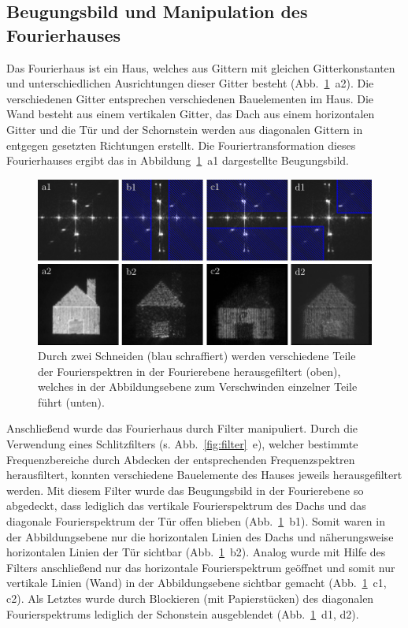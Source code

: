 \subsection{Beugungsbild und Manipulation des Fourierhauses}

Das Fourierhaus ist ein Haus, welches aus Gittern mit gleichen Gitterkonstanten und unterschiedlichen Ausrichtungen dieser Gitter besteht (Abb.~\ref{fig:fourierhaus_mit_filtern}~a2). Die verschiedenen Gitter entsprechen verschiedenen Bauelementen im Haus. Die Wand besteht aus einem vertikalen Gitter, das Dach aus einem horizontalen Gitter und die Tür und der Schornstein werden aus diagonalen Gittern in entgegen gesetzten Richtungen erstellt. Die Fouriertransformation dieses Fourierhauses ergibt das in Abbildung~\ref{fig:fourierhaus_mit_filtern}~a1 dargestellte Beugungsbild.

\begin{figure}[h]
	\centering
	\includegraphics[scale=1]{images/Regina/abb21.pdf}
	
	\caption[Fourierhaus mit verschiedenen Filtern]{
		Durch zwei Schneiden (blau schraffiert) werden verschiedene Teile der Fourierspektren in der Fourierebene herausgefiltert (oben), welches in der Abbildungsebene zum Verschwinden einzelner Teile führt (unten).
	}
	\label{fig:fourierhaus_mit_filtern}
\end{figure}

Anschließend wurde das Fourierhaus durch Filter manipuliert. Durch die Verwendung eines Schlitzfilters (s. Abb.~\ref{fig:filter}~e), welcher bestimmte Frequenzbereiche durch Abdecken der entsprechenden Frequenzspektren herausfiltert, konnten verschiedene Bauelemente des Hauses jeweils herausgefiltert werden. Mit diesem Filter wurde das Beugungsbild in der Fourierebene so abgedeckt, dass lediglich das vertikale Fourierspektrum des Dachs und das diagonale Fourierspektrum der Tür offen blieben (Abb.~\ref{fig:fourierhaus_mit_filtern}~b1). Somit waren in der Abbildungsebene nur die horizontalen Linien des Dachs und näherungsweise horizontalen Linien der Tür sichtbar (Abb.~\ref{fig:fourierhaus_mit_filtern}~b2). Analog wurde mit Hilfe des Filters anschließend nur das horizontale Fourierspektrum geöffnet und somit nur vertikale Linien (Wand) in der Abbildungsebene sichtbar gemacht (Abb.~\ref{fig:fourierhaus_mit_filtern}~c1, c2). Als Letztes wurde durch Blockieren (mit Papierstücken) des diagonalen Fourierspektrums lediglich der Schonstein ausgeblendet (Abb.~\ref{fig:fourierhaus_mit_filtern}~d1, d2).

